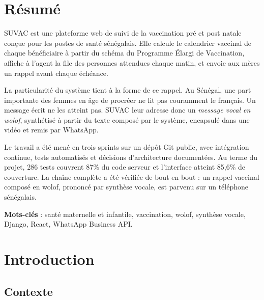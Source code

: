 \documentclass[11pt,a4paper]{report}
\begin{document}
\chapter*{Résumé}

SUVAC est une plateforme web de suivi de la vaccination pré et post natale
conçue pour les postes de santé sénégalais. Elle calcule le calendrier
vaccinal de chaque bénéficiaire à partir du schéma du Programme Élargi de
Vaccination, affiche à l'agent la file des personnes attendues chaque
matin, et envoie aux mères un rappel avant chaque échéance.

La particularité du système tient à la forme de ce rappel. Au Sénégal, une
part importante des femmes en âge de procréer ne lit pas couramment le
français. Un message écrit ne les atteint pas. SUVAC leur adresse donc un
\emph{message vocal en wolof}, synthétisé à partir du texte composé par le
système, encapsulé dans une vidéo et remis par WhatsApp.

Le travail a été mené en trois sprints sur un dépôt Git public, avec
intégration continue, tests automatisés et décisions d'architecture
documentées. Au terme du projet, 286 tests couvrent 87\% du code serveur et
l'interface atteint 85,6\% de couverture. La chaîne complète a été vérifiée
de bout en bout : un rappel vaccinal composé en wolof, prononcé par
synthèse vocale, est parvenu sur un téléphone sénégalais.

\bigskip
\noindent\textbf{Mots-clés} : santé maternelle et infantile, vaccination,
wolof, synthèse vocale, Django, React, WhatsApp Business API.

\tableofcontents
\clearpage

\chapter{Introduction}

\section{Contexte}
\end{document}
